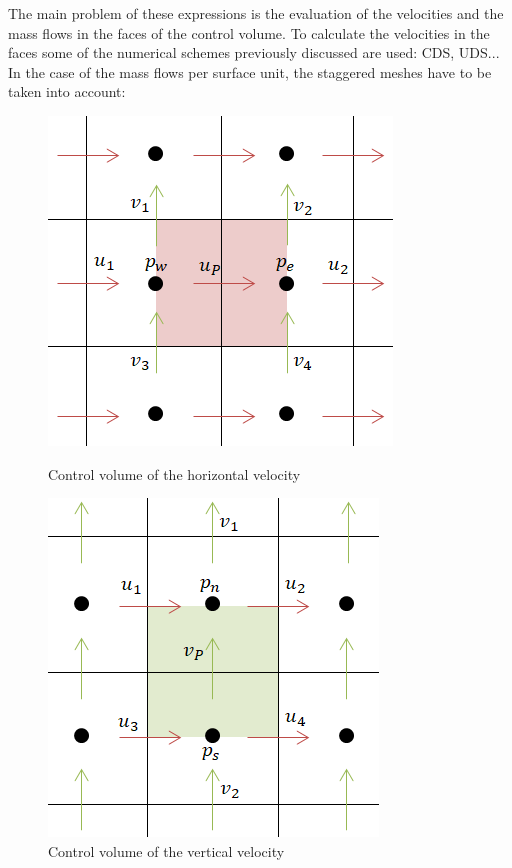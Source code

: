 The main problem of these expressions is the evaluation of the velocities and the mass flows in the faces of the control volume. To calculate the velocities in the faces some of the numerical schemes previously discussed are used: CDS, UDS... In the case of the mass flows per surface unit, the staggered meshes have to be taken into account:
\begin{figure}[h]
	\centering
	\begin{minipage}{.5\textwidth}
		\centering
		\includegraphics[scale=0.7]{DrivenCavity/mflowx3}
		\caption{Control volume of the horizontal velocity}
		\label{DCmflowx}
	\end{minipage}%
	\begin{minipage}{.5\textwidth}
		\centering
		\includegraphics[scale=0.68]{DrivenCavity/mflowy3}
		\caption{Control volume of the vertical velocity}
		\label{DCmflowy}
	\end{minipage}
\end{figure}
